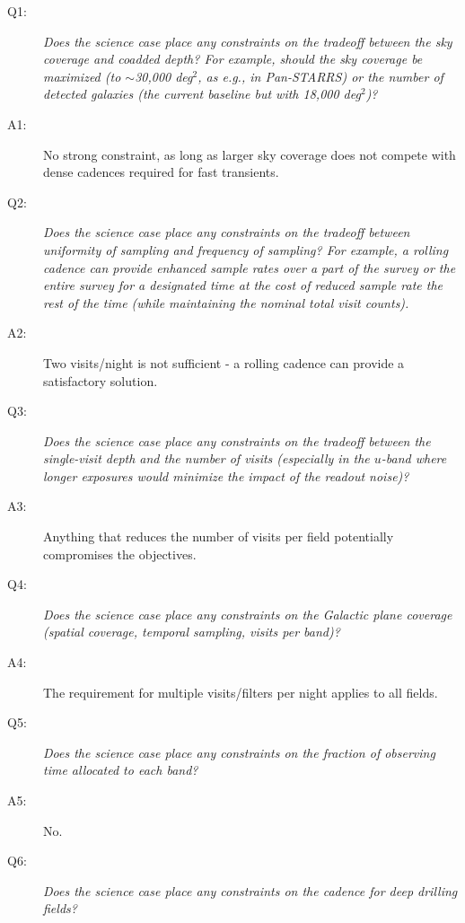  \begin{description}

 \item[Q1:] {\it Does the science case place any constraints on the
 tradeoff between the sky coverage and coadded depth? For example, should
 the sky coverage be maximized (to $\sim$30,000 deg$^2$, as e.g., in
 Pan-STARRS) or the number of detected galaxies (the current baseline but
 with 18,000 deg$^2$)?}

 \item[A1:] No strong constraint, as long as larger sky coverage does not compete with dense cadences
required for fast transients.

 \item[Q2:] {\it Does the science case place any constraints on the
 tradeoff between uniformity of sampling and frequency of  sampling? For
 example, a rolling cadence can provide enhanced sample rates over a part
 of the survey or the entire survey for a designated time at the cost of
 reduced sample rate the rest of the time (while maintaining the nominal
 total visit counts).}

 \item[A2:] Two visits/night is not sufficient - a rolling cadence can provide a satisfactory solution.

 \item[Q3:] {\it Does the science case place any constraints on the
 tradeoff between the single-visit depth and the number of visits
 (especially in the $u$-band where longer exposures would minimize the
 impact of the readout noise)?}

 \item[A3:] Anything that reduces the number of visits per field potentially compromises the objectives.

 \item[Q4:] {\it Does the science case place any constraints on the
 Galactic plane coverage (spatial coverage, temporal sampling, visits per
 band)?}

 \item[A4:] The requirement for multiple visits/filters per night applies to all fields.

 \item[Q5:] {\it Does the science case place any constraints on the
 fraction of observing time allocated to each band?}

 \item[A5:] No.

 \item[Q6:] {\it Does the science case place any constraints on the
 cadence for deep drilling fields?}


\end{description}

